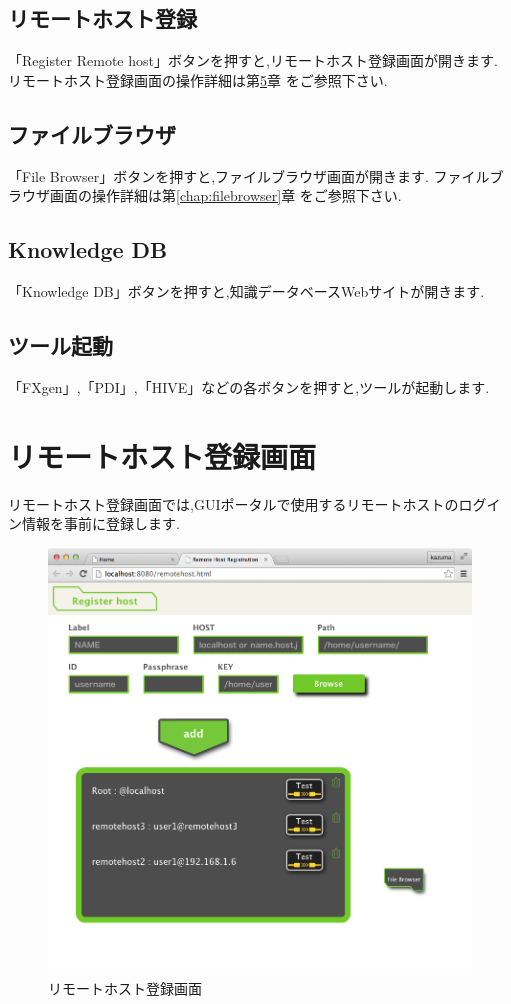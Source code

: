 \documentclass[a4paper,10pt,oneside]{jsbook}
\begin{document}
\section{リモートホスト登録}
「Register Remote host」ボタンを押すと,リモートホスト登録画面が開きます.
リモートホスト登録画面の操作詳細は第\ref{chap:remotehost}章 をご参照下さい.

\section{ファイルブラウザ}
「File Browser」ボタンを押すと,ファイルブラウザ画面が開きます.
ファイルブラウザ画面の操作詳細は第\ref{chap:filebrowser}章 をご参照下さい.

\section{Knowledge DB}
「Knowledge DB」ボタンを押すと,知識データベースWebサイトが開きます.
\section{ツール起動}
「FXgen」,「PDI」,「HIVE」などの各ボタンを押すと,ツールが起動します.


\chapter{リモートホスト登録画面}
\label{chap:remotehost}
リモートホスト登録画面では,GUIポータルで使用するリモートホストのログイン情報を事前に登録します.

\begin{figure}[htbp]
	\begin{center}
		\includegraphics[width=12.0cm]{image/remotehost_000.png}
	\end{center}
	\caption{リモートホスト登録画面}
	\label{fig:remotehost}
\end{figure}
\end{document}
